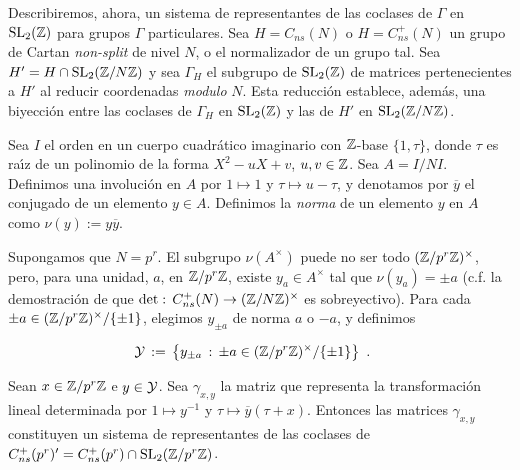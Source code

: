 Describiremos, ahora, un sistema de representantes de las coclases de $\Gamma$ en
$\SL{2}(\bb{Z})$ para grupos $\Gamma$ particulares. Sea $H=C_{ns}(N)$ o
$H=C_{ns}^{+}(N)$ un grupo de Cartan \textit{non-split} de nivel $N$, o el
normalizador de un grupo tal. Sea $H'=H\cap\SL{2}(\bb{Z}/N\bb{Z})$ y sea
$\Gamma_{H}$ el subgrupo de $\SL{2}(\bb{Z})$ de matrices pertenecientes a $H'$
al reducir coordenadas \textit{modulo} $N$. Esta reducci\'{o}n establece,
adem\'{a}s, una biyecci\'{o}n entre las coclases de $\Gamma_{H}$ en
$\SL{2}(\bb{Z})$ y las de $H'$ en $\SL{2}(\bb{Z}/N\bb{Z})$.

Sea $I$ el orden en un cuerpo cuadr\'{a}tico imaginario con $\bb{Z}$-base
$\{1,\tau\}$, donde $\tau$ es ra\'{\i}z de un polinomio de la forma
$X^{2}-uX+v$, $u,v\in\bb{Z}$. Sea $A=I/NI$. Definimos una involuci\'{o}n en $A$
por $1\mapsto 1$ y $\tau\mapsto u-\tau$, y denotamos por $\overline{y}$ el
conjugado de un elemento $y\in A$. Definimos la \emph{norma} de un elemento $y$
en $A$ como $\nu(y):=y\overline{y}$.

Supongamos que $N=p^{r}$. El subgrupo $\nu(A^{\times})$ puede no ser
todo $(\bb{Z}/p^{r}\bb{Z})^{\times}$, pero, para una unidad, $a$, en
$\bb{Z}/p^{r}\bb{Z}$, existe $y_{a}\in A^{\times}$ tal que $\nu(y_{a})=\pm a$
(c.f. la demostraci\'{o}n de que
$\det:\,C_{ns}^{+}(N)\rightarrow(\bb{Z}/N\bb{Z})^{\times}$ es sobreyectivo).
Para cada $\pm a\in(\bb{Z}/p^{r}\bb{Z})^{\times}/\{\pm 1\}$, elegimos $y_{\pm a}$
de norma $a$ o $-a$, y definimos

\begin{align*}
 \cal{Y} & \,:=\,\left\lbrace y_{\pm a}
 \,:\,\pm a\in(\bb{Z}/p^{r}\bb{Z})^{\times}/\{\pm 1\}\right\rbrace
 \text{ .}
\end{align*}

\begin{lemaRepsCoclasesDelNormalizador}\label{thm:lemaRepsCoclasesDelNormalizador}
 Sean $x\in\bb{Z}/p^{r}\bb{Z}$ e $y\in \cal{Y}$. Sea $\gamma_{x,y}$ la matriz que
 representa la transformaci\'{o}n lineal determinada por $1\mapsto y^{-1}$ y
 $\tau\mapsto\overline{y}(\tau+x)$. Entonces las matrices $\gamma_{x,y}$
 constituyen un sistema de representantes de las coclases de
 $C_{ns}^{+}(p^{r})'=C_{ns}^{+}(p^{r})\cap\SL{2}(\bb{Z}/p^{r}\bb{Z})$.
\end{lemaRepsCoclasesDelNormalizador}

